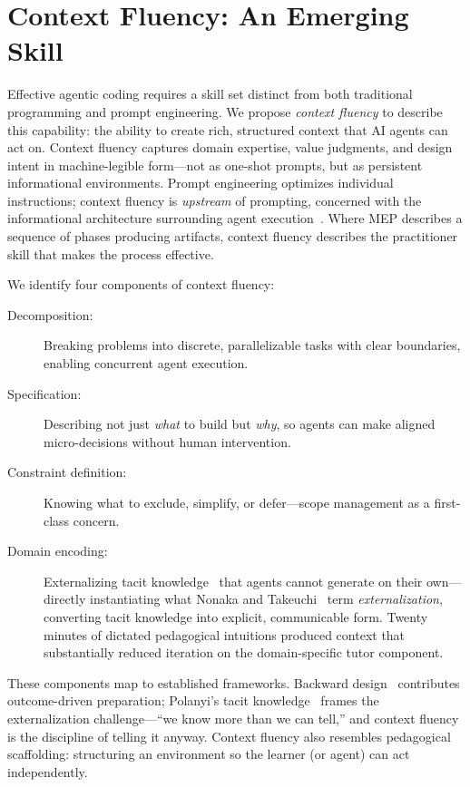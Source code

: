 \section{Context Fluency: An Emerging Skill}

Effective agentic coding requires a skill set distinct from both
traditional programming and prompt engineering. We propose
\emph{context fluency} to describe this capability: the ability to
create rich, structured context that AI agents can act on. Context
fluency captures domain expertise, value judgments, and design intent
in machine-legible form---not as one-shot prompts, but as persistent
informational environments. Prompt engineering optimizes individual
instructions; context fluency is \emph{upstream} of prompting,
concerned with the informational architecture surrounding agent
execution~\cite{anthropic2025context, gartner2025context}. Where MEP
describes a sequence of phases producing artifacts, context fluency
describes the practitioner skill that makes the process effective.

We identify four components of context fluency:
\begin{description}
  \item[Decomposition:] Breaking problems into discrete, parallelizable
    tasks with clear boundaries, enabling concurrent agent execution.
  \item[Specification:] Describing not just \emph{what} to build but
    \emph{why}, so agents can make aligned micro-decisions without human
    intervention.
  \item[Constraint definition:] Knowing what to exclude, simplify, or
    defer---scope management as a first-class concern.
  \item[Domain encoding:] Externalizing tacit
    knowledge~\cite{polanyi1966tacit} that agents cannot generate on
    their own---directly instantiating what Nonaka and
    Takeuchi~\cite{nonaka1995knowledge} term \emph{externalization},
    converting tacit knowledge into explicit, communicable form.
    Twenty minutes of dictated pedagogical intuitions
    produced context that substantially reduced iteration on the
    domain-specific tutor component.
\end{description}

These components map to established frameworks. Backward
design~\cite{wiggins1998understanding} contributes outcome-driven
preparation; Polanyi's tacit knowledge~\cite{polanyi1958personal}
frames the externalization challenge---``we know more than we can
tell,'' and context fluency is the discipline of telling it anyway.
Context fluency also resembles pedagogical scaffolding: structuring
an environment so the learner (or agent) can act independently.

